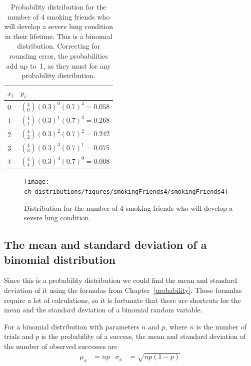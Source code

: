 \begin{table}[h]
\centering
\begin{tabular}{l l}
$x_i$ & $p_i$ \\
\hline
0 &  ${4\choose 0}(0.3)^0(0.7)^{4} = 0.058$ \vspace{1mm}\\
1 &  ${4\choose 1}(0.3)^1(0.7)^{3} = 0.268$  \vspace{1mm}\\
2 & ${4\choose 2}(0.3)^2(0.7)^{2} = 0.242$  \vspace{1mm}\\
3 & ${4\choose 3}(0.3)^3(0.7)^{1} = 0.075$  \vspace{1mm}\\
4 & ${4\choose 4}(0.3)^4(0.7)^{0} = 0.008$  \vspace{1mm}\\
\hline
\end{tabular}
\caption{Probability distribution for the number of 4 smoking friends who will develop a severe lung condition in their lifetime. This is a binomial distribution. Correcting for rounding error, the probabilities add up to~1, as they must for any probability distribution.}
\label{binomDistrSmokers}
\end{table}

\begin{figure}[h]
\centering
\texttt{[image: ch\_distributions/figures/smokingFriends4/smokingFriends4]}
\caption{Distribution for the number of 4 smoking friends who will develop a severe lung condition.}
\label{smokingFriends4}
\end{figure}


\subsection{The mean and standard deviation of a binomial distribution}

Since this is a probability distribution we could find the mean and standard deviation of it using the formulas from Chapter~\ref{probability}. Those formulas require a lot of calculations, so it is fortunate that there are shortcuts for the mean and the standard deviation of a binomial random variable.

\begin{termBox}{
For a binomial distribution with parameters $n$ and $p$, where $n$ is the number of trials and $p$ is the probability of a success, the mean and standard deviation of the number of observed successes are\vspace{-2mm}
\begin{align}
\mu_x &= np
	&\sigma_x &= \sqrt{np(1-p)}
\label{binomialStats}
\end{align}
}
\end{termBox}


